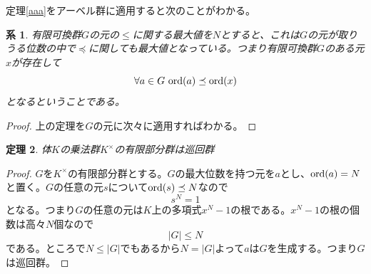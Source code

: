 \documentclass{jsarticle}
\newtheorem{thm}{定理}
\newtheorem{cor}[thm]{系}
\newcommand{\kk}{K^{\times}}
\newcommand{\ord}{\text{{\rm ord}}}
\begin{document}
定理\ref{aaa}をアーベル群に適用すると次のことがわかる。

\begin{cor}
有限可換群$G$の元の$\le$に関する最大値を$N$とすると、これは$G$の元が取りうる位数の中で$\preceq$に関しても最大値となっている。つまり有限可換群$G$のある元$x$が存在して
\[
\forall a\in G\ \ord(a)\preceq \ord(x)
\]
となるということである。
\end{cor}
\begin{proof}上の定理を$G$の元に次々に適用すればわかる。

\end{proof}

\begin{thm}
体$K$の乗法群$\kk$の有限部分群は巡回群
\end{thm}

\begin{proof}
$G$を$\kk$の有限部分群とする。$G$の最大位数を持つ元を$a$とし、$\ord(a)=N$と置く。$G$の任意の元$s$について$\ord(s)\preceq N$なので
\[
s^N=1
\]
となる。つまり$G$の任意の元は$K$上の多項式$x^N-1$の根である。$x^N-1$の根の個数は高々$N$個なので
\[
|G|\le N
\]
である。ところで$N\le |G|$でもあるから$N=|G|$よって$a$は$G$を生成する。つまり$G$は巡回群。
\end{proof}
































	





			
\end{document}
